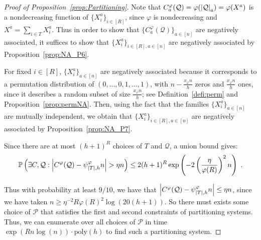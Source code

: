 \begin{proof}[Proof of Proposition~\ref{prop:Partitioning}]

    Note that $C_a^{\varphi}(\mathcal{Q}) = \varphi(\abs{\mathcal{Q}}_a) = \varphi(X^a)$ is a nondecreasing function of $\{ X^a_i \}_{i \in  [R]}$, since $\varphi$ is nondecreasing and $X^a = \sum_{i \in T} X^a_i$. Thus in order to show that $\{ C_a^{\varphi}(\mathcal{Q}) \}_{a \in [n]}$ are negatively associated, it suffices to show that $\{ X^a_i \}_{i \in  [R],a \in [n]}$ are negatively associated by Proposition~\ref{prop:NA_P6}.%

    For fixed $i \in [R]$, $\{ X^a_i \}_{a \in [n]}$ are negatively associated because it corresponds to a permutation distribution of $(0,\ldots,0,1,\ldots,1)$, with $n-\frac{x_{\varphi}n}{h}$ zeros and $\frac{x_{\varphi}n}{h}$ ones, since it describes a random subset of size $\frac{x_{\varphi}n}{h}$; see Definition~\ref{defi:perm} and Proposition~\ref{prop:permNA}. Then, using the fact that the families $\{ X^a_i \}_{a \in [n]}$ are mutually independent, we obtain that $\{ X^a_i \}_{i \in  [R],a \in [n]}$ are negatively associated by Proposition~\ref{prop:NA_P7}.%
    
    Since there are at most $(h+1)^R$ choices of $T$ and $\mathcal{Q}$, a union bound gives:
    \[ \mathbb{P}\left(\exists C,\mathcal{Q} : \abs{C^{\varphi}(\mathcal{Q}) -\psi^{\varphi}_{\abs{T},h} n} > \eta n\right) \leq 2(h+1)^R \exp\left(-2\left(\frac{\eta}{\varphi(R)}\right)^2n\right)\ .\]

    Thus with probability at least $9/10$, we have that $\abs{C^{\varphi}(\mathcal{Q}) -\psi^{\varphi}_{\abs{T},h} n} \leq \eta n$, since we have taken $n \geq \eta^{-2}R\varphi(R)^2\log(20(h+1))$. So there must exists some choice of $\mathcal{P}$ that satisfies the first and second constraints of partitioning systems. Thus, we can enumerate over all choices of $\mathcal{P}$ in time $\exp(Rn\log(n))\cdot\text{poly}(h)$ to find such a partitioning system.
\end{proof}

